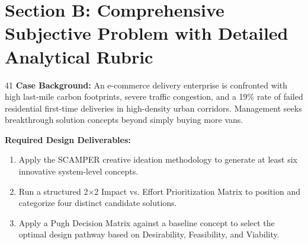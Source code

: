 \newpage
\section{Section B: Comprehensive Subjective Problem with Detailed Analytical Rubric}

\begin{subjectiveq}{4}{1}
\textbf{Case Background:} An e-commerce delivery enterprise is confronted with high last-mile carbon footprints, severe traffic congestion, and a 19\% rate of failed residential first-time deliveries in high-density urban corridors. Management seeks breakthrough solution concepts beyond simply buying more vans.

\textbf{Required Design Deliverables:}
\begin{enumerate}[label=(\alph*)]
    \item Apply the SCAMPER creative ideation methodology to generate at least six innovative system-level concepts.
    \item Run a structured 2$\times$2 Impact vs. Effort Prioritization Matrix to position and categorize four distinct candidate solutions.
    \item Apply a Pugh Decision Matrix against a baseline concept to select the optimal design pathway based on Desirability, Feasibility, and Viability.
\end{enumerate}
\end{subjectiveq}

